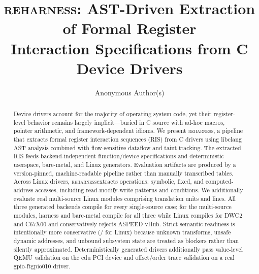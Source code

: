 \documentclass[sigconf,review]{acmart}
\newcommand{\reharness}{\textsc{reharness}}
\begin{document}
\title{\reharness: AST-Driven Extraction of Formal Register\\Interaction Specifications from C Device Drivers}

\author{Anonymous Author(s)}

\begin{abstract}
Device drivers account for the majority of operating system code, yet their register-level behavior remains largely implicit---buried in C source with ad-hoc macros, pointer arithmetic, and framework-dependent idioms. We present \reharness, a pipeline that extracts formal register interaction sequences (RIS) from C drivers using libclang AST analysis combined with flow-sensitive dataflow and taint tracking. The extracted RIS feeds backend-independent function/device specifications and deterministic userspace, bare-metal, and Linux generators. Evaluation artifacts are produced by a version-pinned, machine-readable pipeline rather than manually transcribed tables. Across \EvalDrivers{} Linux drivers, \reharness extracts \EvalOps{} operations: \EvalSymbolic{} symbolic, \EvalFixed{} fixed, and \EvalComputed{} computed-address accesses, including \EvalRMW{} read-modify-write patterns and \EvalConditions{} conditions. We additionally evaluate \MultiSourceDrivers{} real multi-source Linux modules comprising \MultiSourceTUs{} translation units and \MultiSourceLines{} lines. All three generated backends compile for every single-source case; for the multi-source modules, harness and bare-metal compile for all three while Linux compiles for DWC2 and C67X00 and conservatively rejects ASPEED vHub. Strict semantic readiness is intentionally more conservative (\LinuxReadyCount{}/\EvalDrivers{} for Linux) because unknown transforms, unsafe dynamic addresses, and unbound subsystem state are treated as blockers rather than silently approximated. Deterministically generated drivers additionally pass value-level QEMU validation on the edu PCI device and offset/order trace validation on a real gpio-ftgpio010 driver.
\end{abstract}


\maketitle
\end{document}
